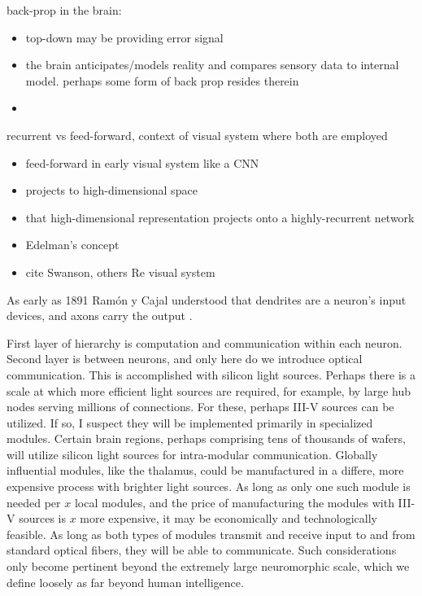 \vspace{3em}
back-prop in the brain:
\begin{itemize}
\item top-down may be providing error signal
\item the brain anticipates/models reality and compares sensory data to internal model. perhaps some form of back prop resides therein
\item \cite{scbe2017}
\end{itemize}

\vspace{3em}
recurrent vs feed-forward, context of visual system where both are employed
\begin{itemize}
\item feed-forward in early visual system like a CNN
\item projects to high-dimensional space
\item that high-dimensional representation projects onto a highly-recurrent network
\item Edelman's concept
\item cite Swanson, others Re visual system
\end{itemize}

\vspace{3em}
As early as 1891 Ram\'{o}n y Cajal understood that dendrites are a neuron's input devices, and axons carry the output \cite{hoko2006}.

\vspace{3em}
First layer of hierarchy is computation and communication within each neuron. Second layer is between neurons, and only here do we introduce optical communication. This is accomplished with silicon light sources. Perhaps there is a scale at which more efficient light sources are required, for example, by large hub nodes serving millions of connections. For these, perhaps III-V sources can be utilized. If so, I suspect they will be implemented primarily in specialized modules. Certain brain regions, perhaps comprising tens of thousands of wafers, will utilize silicon light sources for intra-modular communication. Globally influential modules, like the thalamus, could be manufactured in a differe, more expensive process with brighter light sources. As long as only one such module is needed per $x$ local modules, and the price of manufacturing the modules with III-V sources is $x$ more expensive, it may be economically and technologically feasible. As long as both types of modules transmit and receive input to and from standard optical fibers, they will be able to communicate. Such considerations only become pertinent beyond the extremely large neuromorphic scale, which we define loosely as far beyond human intelligence. 

